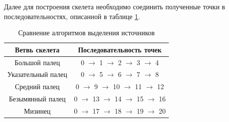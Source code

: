 Далее для построения скелета необходимо соединить полученные точки в последовательностях, описанной в таблице \ref{tab:keypoints_skeleton}.

\begin{table}[h]
	\caption{\label{tab:keypoints_skeleton}Сравнение алгоритмов выделения источников}
	\begin{center}
		\begin{tabular}{|c|c|}
			\hline
			Ветвь скелета & Последовательность точек \\
			\hline
			Большой палец & 0 $\rightarrow$ 1 $\rightarrow$ 2 $\rightarrow$ 3 $\rightarrow$ 4 \\
			Указательный палец & 0 $\rightarrow$ 5 $\rightarrow$ 6 $\rightarrow$ 7 $\rightarrow$ 8 \\
			Средний палец & 0 $\rightarrow$ 9 $\rightarrow$ 10 $\rightarrow$ 11 $\rightarrow$ 12 \\
			Безымянный палец & 0 $\rightarrow$ 13 $\rightarrow$ 14 $\rightarrow$ 15 $\rightarrow$ 16 \\
			Мизинец & 0 $\rightarrow$ 17 $\rightarrow$ 18 $\rightarrow$ 19 $\rightarrow$ 20 \\
			\hline
		\end{tabular}
	\end{center}
\end{table} 
